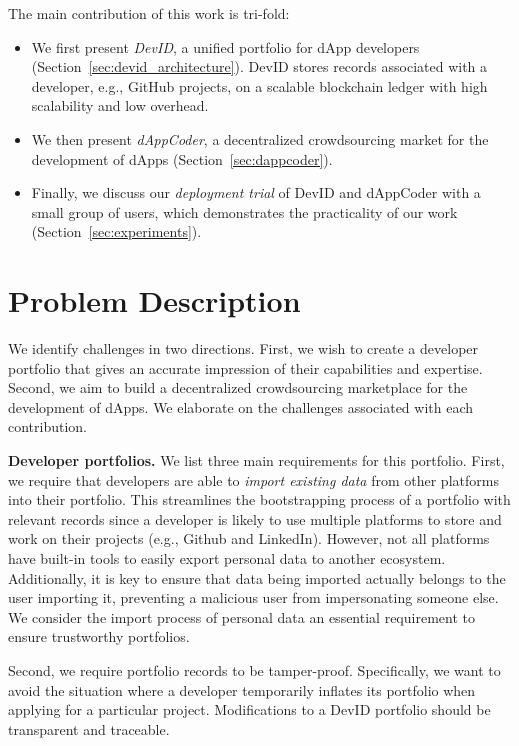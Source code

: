 The main contribution of this work is tri-fold:
\begin{itemize}
	\item We first present \emph{DevID}, a unified portfolio for dApp developers (Section~\ref{sec:devid_architecture}). DevID stores records associated with a developer, e.g., GitHub projects, on a scalable blockchain ledger with high scalability and low overhead.
	\item We then present \emph{dAppCoder}, a decentralized crowdsourcing market for the development of dApps (Section~\ref{sec:dappcoder}).
	\item Finally, we discuss our \emph{deployment trial} of DevID and dAppCoder with a small group of users, which demonstrates the practicality of our work (Section~\ref{sec:experiments}).
\end{itemize}

\section{Problem Description}
\label{sec:problem_description}
We identify challenges in two directions.
First, we wish to create a developer portfolio that gives an accurate impression of their capabilities and expertise.
Second, we aim to build a decentralized crowdsourcing marketplace for the development of dApps.
We elaborate on the challenges associated with each contribution.

\textbf{Developer portfolios.}
We list three main requirements for this portfolio.
First, we require that developers are able to \emph{import existing data} from other platforms into their portfolio.
This streamlines the bootstrapping process of a portfolio with relevant records since a developer is likely to use multiple platforms to store and work on their projects (e.g., Github and LinkedIn).
However, not all platforms have built-in tools to easily export personal data to another ecosystem.
Additionally, it is key to ensure that data being imported actually belongs to the user importing it, preventing a malicious user from impersonating someone else.
We consider the import process of personal data an essential requirement to ensure trustworthy portfolios.

Second, we require portfolio records to be tamper-proof.
Specifically, we want to avoid the situation where a developer temporarily inflates its portfolio when applying for a particular project.
Modifications to a DevID portfolio should be transparent and traceable.

